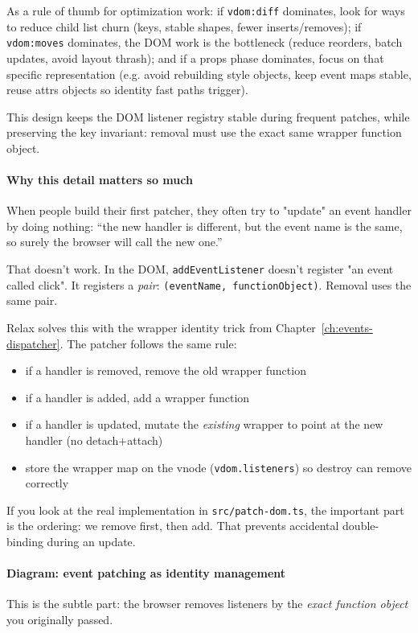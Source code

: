 As a rule of thumb for optimization work: if \texttt{vdom:diff} dominates, look for ways to reduce child list churn (keys, stable shapes, fewer inserts/removes); if \texttt{vdom:moves} dominates, the DOM work is the bottleneck (reduce reorders, batch updates, avoid layout thrash); and if a props phase dominates, focus on that specific representation (e.g. avoid rebuilding style objects, keep event maps stable, reuse attrs objects so identity fast paths trigger).

This design keeps the DOM listener registry stable during frequent patches, while preserving the key invariant: removal must use the exact same wrapper function object.

\paragraph{Why this detail matters so much}
When people build their first patcher, they often try to "update" an event handler by doing nothing:
``the new handler is different, but the event name is the same, so surely the browser will call the new one.''

That doesn't work.
In the DOM, \texttt{addEventListener} doesn't register "an event called click".
It registers a \emph{pair}: \texttt{(eventName, functionObject)}.
Removal uses the same pair.

Relax solves this with the wrapper identity trick from Chapter~\ref{ch:events-dispatcher}. The patcher follows the same rule:

\begin{itemize}
  \item if a handler is removed, remove the old wrapper function
  \item if a handler is added, add a wrapper function
  \item if a handler is updated, mutate the \emph{existing} wrapper to point at the new handler (no detach+attach)
  \item store the wrapper map on the vnode (\texttt{vdom.listeners}) so destroy can remove correctly
\end{itemize}

If you look at the real implementation in \texttt{src/patch-dom.ts}, the important part is the ordering:
we remove first, then add. That prevents accidental double-binding during an update.

\paragraph{Diagram: event patching as identity management}
This is the subtle part: the browser removes listeners by the \emph{exact function object} you originally passed.

